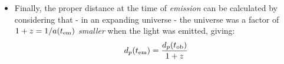 \documentclass[11pt]{article}
\newcommand{\tem}{\ensuremath{t_{\rm em}}}
\newcommand{\tob}{\ensuremath{t_{\rm ob}}}
\begin{document}
\begin{itemize}
\item Finally, the proper distance at the time of {\it emission} can be calculated by considering that - in an expanding universe - the universe was a factor of $1+z = 1/a(\tem)$ {\it smaller} when the light was emitted, giving:
\begin{equation}
    d_p(t_{\rm em}) = \frac{d_p(\tob)}{1+z}
\end{equation}

\end{itemize}
\end{document}
